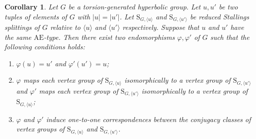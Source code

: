 \documentclass[a4paper, 11pt]{amsart}
\newtheorem{co}[te]{Corollary}
\theoremstyle{definition}
\theoremstyle{remark}
\begin{document}
\begin{co}\label{main_theorem1.1}
Let $G$ be a torsion-generated  hyperbolic group. Let $u,u'$ be two tuples of elements of $G$ with $\vert u\vert =\vert u'\vert $. Let $\mathrm{S}_{G,\langle u\rangle}$ and $\mathrm{S}_{G,\langle u'\rangle}$ be reduced Stallings splittings of $G$ relative to $\langle u\rangle$ and $\langle u'\rangle$ respectively. Suppose that $u$ and $u'$ have the same $\mathrm{AE}$-type. Then there exist two endomorphisms $\varphi,\varphi'$ of $G$ such that the following conditions holds:
\begin{enumerate}[(1)]
    \item $\varphi(u)=u'$ and $\varphi'(u')=u$;
    \item $\varphi$ maps each vertex group of $\mathrm{S}_{G,\langle u\rangle}$ isomorphically to a vertex group of $\mathrm{S}_{G,\langle u'\rangle}$ and $\varphi'$ maps each vertex group of $\mathrm{S}_{G,\langle u'\rangle}$ isomorphically to a vertex group of $\mathrm{S}_{G,\langle u\rangle}$;
    \item $\varphi$ and $\varphi'$ induce one-to-one correspondences between the conjugacy classes of vertex groups of $\mathrm{S}_{G,\langle u\rangle}$ and $\mathrm{S}_{G,\langle u'\rangle}$.
\end{enumerate}
\end{co}

\end{document}
